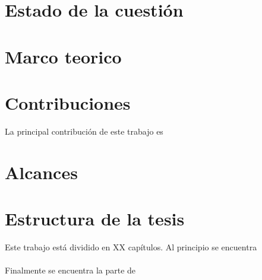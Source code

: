 \section{Estado de la cuestión}




\section{Marco teorico}


\blindtext


\section{Contribuciones}

La principal contribución de este trabajo es 
\blindtext



\section{Alcances}

\section{Estructura de la tesis}

Este trabajo está dividido en XX capítulos. Al principio se encuentra 
\\\\
Finalmente se encuentra la parte de 